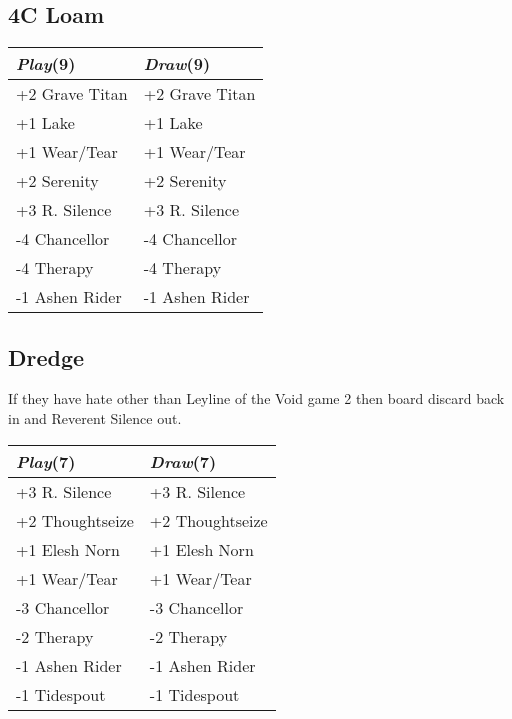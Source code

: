 \documentclass{article}
\renewcommand *\contentsname{Contents}
\begin{document}
\begin{multicols}{2}
\subsection*{4C Loam}
\begin{center}
\begin{tabular}{| l | l |}
\hline
\textit{Play}(9) & \textit{Draw}(9) \\
\hline
\cellcolor[HTML]{BBDDBB}\small{+2 Grave Titan} & \cellcolor[HTML]{BBDDBB}\small{+2 Grave Titan}\\
\cellcolor[HTML]{BBDDBB}\small{+1 Lake} & \cellcolor[HTML]{BBDDBB}\small{+1 Lake}\\
\cellcolor[HTML]{BBDDBB}\small{+1 Wear/Tear} & \cellcolor[HTML]{BBDDBB}\small{+1 Wear/Tear}\\
\cellcolor[HTML]{BBDDBB}\small{+2 Serenity} & \cellcolor[HTML]{BBDDBB}\small{+2 Serenity}\\
\cellcolor[HTML]{BBDDBB}\small{+3 R. Silence} & \cellcolor[HTML]{BBDDBB}\small{+3 R. Silence}\\
\cellcolor[HTML]{DDBBBB}\small{-4 Chancellor} & \cellcolor[HTML]{DDBBBB}\small{-4 Chancellor}\\
\cellcolor[HTML]{DDBBBB}\small{-4 Therapy} & \cellcolor[HTML]{DDBBBB}\small{-4 Therapy}\\
\cellcolor[HTML]{DDBBBB}\small{-1 Ashen Rider} & \cellcolor[HTML]{DDBBBB}\small{-1 Ashen Rider}\\
\hline
\end{tabular}
\end{center}
\subsection*{Dredge}
If they have hate other than Leyline of the Void game 2 then board discard back in and Reverent Silence out.\begin{center}
\begin{tabular}{| l | l |}
\hline
\textit{Play}(7) & \textit{Draw}(7) \\
\hline
\cellcolor[HTML]{BBDDBB}\small{+3 R. Silence} & \cellcolor[HTML]{BBDDBB}\small{+3 R. Silence}\\
\cellcolor[HTML]{BBDDBB}\small{+2 Thoughtseize} & \cellcolor[HTML]{BBDDBB}\small{+2 Thoughtseize}\\
\cellcolor[HTML]{BBDDBB}\small{+1 Elesh Norn} & \cellcolor[HTML]{BBDDBB}\small{+1 Elesh Norn}\\
\cellcolor[HTML]{BBDDBB}\small{+1 Wear/Tear} & \cellcolor[HTML]{BBDDBB}\small{+1 Wear/Tear}\\
\cellcolor[HTML]{DDBBBB}\small{-3 Chancellor} & \cellcolor[HTML]{DDBBBB}\small{-3 Chancellor}\\
\cellcolor[HTML]{DDBBBB}\small{-2 Therapy} & \cellcolor[HTML]{DDBBBB}\small{-2 Therapy}\\
\cellcolor[HTML]{DDBBBB}\small{-1 Ashen Rider} & \cellcolor[HTML]{DDBBBB}\small{-1 Ashen Rider}\\
\cellcolor[HTML]{DDBBBB}\small{-1 Tidespout} & \cellcolor[HTML]{DDBBBB}\small{-1 Tidespout}\\
\hline
\end{tabular}
\end{center}

\end{multicols}
\end{document}
